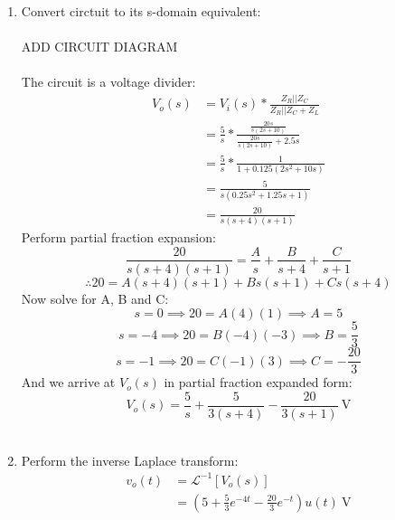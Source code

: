 \begin{enumerate}
	\item{
		Convert circtuit to its s-domain equivalent:
		\\ \\
		ADD CIRCUIT DIAGRAM
		\\ \\
		The circuit is a voltage divider:
		\begin{align*}
			V_o(s) &= V_i(s) * \frac{Z_R || Z_C}{Z_R || Z_C + Z_L} \\
			&= \frac{5}{s} * \frac{\frac{20s}{s(2s+10)}}{\frac{20s}{s(2s+10)}+2.5s} \\
			&= \frac{5}{s} * \frac{1}{1+0.125(2s^2+10s)} \\
			&= \frac{5}{s(0.25s^2+1.25s+1)} \\
			&= \frac{20}{s(s+4)(s+1)}
		\end{align*}
		Perform partial fraction expansion:
		\begin{equation*}
			\frac{20}{s(s+4)(s+1)} = \frac{A}{s} + \frac{B}{s+4} + \frac{C}{s+1}
		\end{equation*}
		\begin{equation*}
			\therefore 20 = A(s+4)(s+1) + Bs(s+1) + Cs(s+4)
		\end{equation*}
		Now solve for A, B and C:
		\begin{equation*}
			s = 0 \implies 20 = A(4)(1) \implies A = 5
		\end{equation*}
		\begin{equation*}
			s = -4 \implies 20 = B(-4)(-3) \implies B = \frac{5}{3}
		\end{equation*}
		\begin{equation*}
			s = -1 \implies 20 = C(-1)(3) \implies C = -\frac{20}{3}
		\end{equation*}
		And we arrive at $V_o(s)$ in partial fraction expanded form:
		\begin{equation*}
			V_o(s) = \frac{5}{s} + \frac{5}{3(s+4)} - \frac{20}{3(s+1)} \ \mathrm{V}
		\end{equation*}
		\\
	}

	\item{
		Perform the inverse Laplace transform:
		\begin{align*}
			v_o(t) &= \mathcal{L}^{-1}\left[ V_o(s) \right] \\
			&= \left(5 + \frac{5}{3}e^{-4t} - \frac{20}{3}e^{-t} \right) u(t) \ \mathrm{V}
		\end{align*}
		\\
	}


\end{enumerate}
